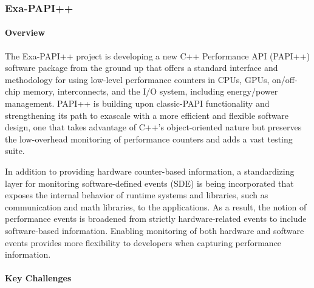 \subsubsection{ Exa-PAPI++}\label{subsubsect:exapapi}

\paragraph{Overview} 


The Exa-PAPI++ 
project is developing a new C++ Performance API (PAPI++) software package 
from the ground up that offers a standard interface and methodology for using
low-level performance counters in CPUs, GPUs, on/off-chip memory, interconnects, 
and the I/O system, including energy/power management. 
PAPI++ is building upon classic-PAPI functionality and strengthening its path to
exascale with a more efficient and flexible software design, one that takes 
advantage of C++'s object-oriented nature but preserves the low-overhead 
monitoring of performance counters and adds a vast testing suite.

In addition to providing hardware counter-based information, a standardizing layer 
for monitoring software-defined events (SDE) is being incorporated that exposes 
the internal behavior of runtime systems and libraries, such as communication and 
math libraries, to the applications. As a result, the notion of performance events is 
broadened from strictly hardware-related events to include software-based 
information. Enabling monitoring of both hardware and software events provides 
more flexibility to developers when capturing performance information.


\paragraph{Key Challenges}

